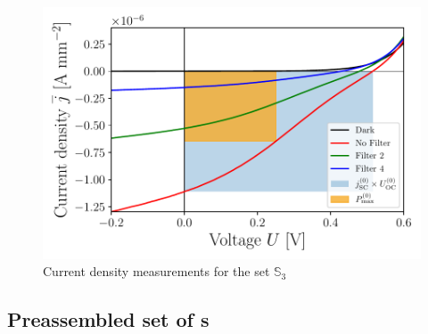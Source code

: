 \begin{figure}[h]\centering
\includegraphics[width=\columnwidth]{../../../IV-Curve-Analysis/OSC2Graph.pdf}
\caption{Current density measurements for the set $\mathbb{S}_3$}
\label{fig:OSC3Graph}
\end{figure}

\subsection{Preassembled set of \BHSC s}

